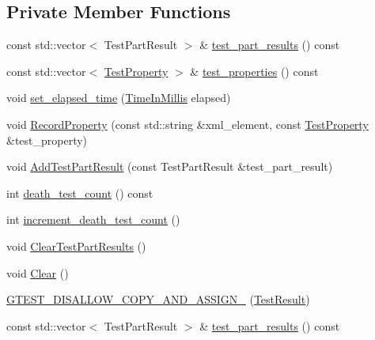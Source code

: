 \subsection*{Private Member Functions}
\begin{DoxyCompactItemize}
\item 
const std\+::vector$<$ Test\+Part\+Result $>$ \& \mbox{\hyperlink{classtesting_1_1_test_result_a2964c3a12ef6ef9bcb47599374514432}{test\+\_\+part\+\_\+results}} () const
\item 
const std\+::vector$<$ \mbox{\hyperlink{classtesting_1_1_test_property}{Test\+Property}} $>$ \& \mbox{\hyperlink{classtesting_1_1_test_result_a8c94e8e89c616abe5d33024a6b54f218}{test\+\_\+properties}} () const
\item 
void \mbox{\hyperlink{classtesting_1_1_test_result_aa345325e5dea41609d17d7c614bf2b18}{set\+\_\+elapsed\+\_\+time}} (\mbox{\hyperlink{namespacetesting_a992de1d091ce660f451d1e8b3ce30fd6}{Time\+In\+Millis}} elapsed)
\item 
void \mbox{\hyperlink{classtesting_1_1_test_result_ac253b0fd7ea70f457e9517e415eac32d}{Record\+Property}} (const std\+::string \&xml\+\_\+element, const \mbox{\hyperlink{classtesting_1_1_test_property}{Test\+Property}} \&test\+\_\+property)
\item 
void \mbox{\hyperlink{classtesting_1_1_test_result_ac28e9821ad3e9314c4fe41b119c5b44d}{Add\+Test\+Part\+Result}} (const Test\+Part\+Result \&test\+\_\+part\+\_\+result)
\item 
int \mbox{\hyperlink{classtesting_1_1_test_result_a827cb78135ac375d81d89ffedc3eca52}{death\+\_\+test\+\_\+count}} () const
\item 
int \mbox{\hyperlink{classtesting_1_1_test_result_a07faaa1d16a991f34222d02e10c75dc2}{increment\+\_\+death\+\_\+test\+\_\+count}} ()
\item 
void \mbox{\hyperlink{classtesting_1_1_test_result_aa11ed718e0a76a39e6380e5ddce7cae2}{Clear\+Test\+Part\+Results}} ()
\item 
void \mbox{\hyperlink{classtesting_1_1_test_result_a5371bc2e69435b4cb1fdad9ca81759a6}{Clear}} ()
\item 
\mbox{\hyperlink{classtesting_1_1_test_result_ad04e1d5d9eb623ba1d9fc82cdff43af4}{G\+T\+E\+S\+T\+\_\+\+D\+I\+S\+A\+L\+L\+O\+W\+\_\+\+C\+O\+P\+Y\+\_\+\+A\+N\+D\+\_\+\+A\+S\+S\+I\+G\+N\+\_\+}} (\mbox{\hyperlink{classtesting_1_1_test_result}{Test\+Result}})
\item 
const std\+::vector$<$ Test\+Part\+Result $>$ \& \mbox{\hyperlink{classtesting_1_1_test_result_a2964c3a12ef6ef9bcb47599374514432}{test\+\_\+part\+\_\+results}} () const

\end{DoxyCompactItemize}
